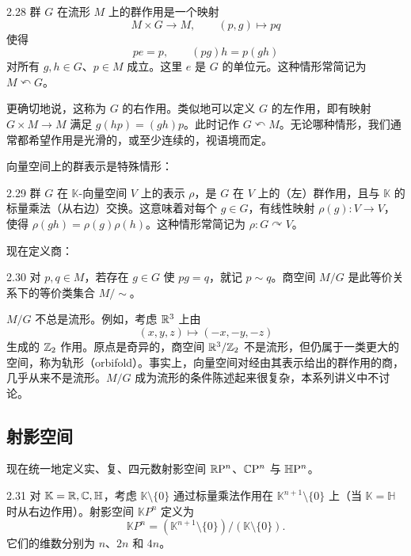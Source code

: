 \begin{definition}{2.28}
群 $G$ 在流形 $M$ 上的群作用是一个映射
\begin{equation}
M\times G\to M,\qquad (p,g)\mapsto pq \tag{2.29}
\end{equation}
使得
\begin{equation}
pe=p,\qquad (pg)h=p(gh) \tag{2.30}
\end{equation}
对所有 $g,h\in G$、$p\in M$ 成立。这里 $e$ 是 $G$ 的单位元。这种情形常简记为 $M\curvearrowleft G$。
\end{definition}

更确切地说，这称为 $G$ 的右作用。类似地可以定义 $G$ 的左作用，即有映射 $G\times M\to M$ 满足 $g(hp)=(gh)p$。此时记作 $G\curvearrowleft M$。无论哪种情形，我们通常都希望作用是光滑的，或至少连续的，视语境而定。

向量空间上的群表示是特殊情形：

\begin{definition}{2.29}
群 $G$ 在 $\mathbb{K}$-向量空间 $V$ 上的表示 $\rho$，是 $G$ 在 $V$ 上的（左）群作用，且与 $\mathbb{K}$ 的标量乘法（从右边）交换。这意味着对每个 $g\in G$，有线性映射 $\rho(g):V\to V$，使得 $\rho(gh)=\rho(g)\rho(h)$。这种情形常简记为 $\rho:G\curvearrowright V$。
\end{definition}

现在定义商：

\begin{definition}{2.30}
对 $p,q\in M$，若存在 $g\in G$ 使 $pg=q$，就记 $p\sim q$。商空间 $M/G$ 是此等价关系下的等价类集合 $M/{\sim}$。
\end{definition}

$M/G$ 不总是流形。例如，考虑 $\mathbb{R}^3$ 上由
\begin{equation}
(x,y,z)\mapsto(-x,-y,-z) \tag{2.31}
\end{equation}
生成的 $\mathbb{Z}_2$ 作用。原点是奇异的，商空间 $\mathbb{R}^3/\mathbb{Z}_2$ 不是流形，但仍属于一类更大的空间，称为轨形（orbifold）。事实上，向量空间对经由其表示给出的群作用的商，几乎从来不是流形。$M/G$ 成为流形的条件陈述起来很复杂，本系列讲义中不讨论。

\subsection{射影空间}

现在统一地定义实、复、四元数射影空间 $\mathbb{R}\mathrm{P}^n$、$\mathbb{C}\mathrm{P}^n$ 与 $\mathbb{H}\mathrm{P}^n$。

\begin{example}{2.31}
对 $\mathbb{K}=\mathbb{R},\mathbb{C},\mathbb{H}$，考虑 $\mathbb{K}\setminus\{0\}$ 通过标量乘法作用在 $\mathbb{K}^{n+1}\setminus\{0\}$ 上（当 $\mathbb{K}=\mathbb{H}$ 时从右边作用）。射影空间 $\mathbb{K}P^n$ 定义为
\begin{equation}
\mathbb{K}P^n=(\mathbb{K}^{n+1}\setminus\{0\})/(\mathbb{K}\setminus\{0\}). \tag{2.32}
\end{equation}
它们的维数分别为 $n$、$2n$ 和 $4n$。
\end{example}

